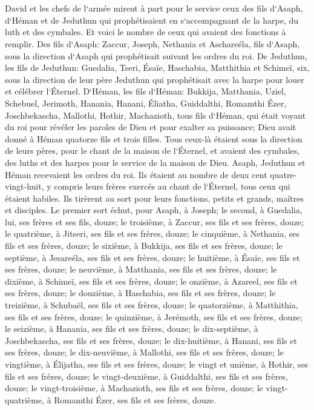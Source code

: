 \chapter{}

\verse David et les chefs de l`armée mirent à part pour le service ceux des fils d`Asaph, d`Héman et de Jeduthun qui prophétisaient en s`accompagnant de la harpe, du luth et des cymbales. Et voici le nombre de ceux qui avaient des fonctions à remplir. 
\verse Des fils d`Asaph: Zaccur, Joseph, Nethania et Aschareéla, fils d`Asaph, sous la direction d`Asaph qui prophétisait suivant les ordres du roi. 
\verse De Jeduthun, les fils de Jeduthun: Guedalia, Tseri, Ésaïe, Haschabia, Matthithia et Schimeï, six, sous la direction de leur père Jeduthun qui prophétisait avec la harpe pour louer et célébrer l`Éternel. 
\verse D`Héman, les fils d`Héman: Bukkija, Matthania, Uziel, Schebuel, Jerimoth, Hanania, Hanani, Éliatha, Guiddalthi, Romamthi Ézer, Joschbekascha, Mallothi, Hothir, Machazioth, 
\verse tous fils d`Héman, qui était voyant du roi pour révéler les paroles de Dieu et pour exalter sa puissance; Dieu avait donné à Héman quatorze fils et trois filles. 
\verse Tous ceux-là étaient sous la direction de leurs pères, pour le chant de la maison de l`Éternel, et avaient des cymbales, des luths et des harpes pour le service de la maison de Dieu. Asaph, Jeduthun et Héman recevaient les ordres du roi. 
\verse Ils étaient au nombre de deux cent quatre-vingt-huit, y compris leurs frères exercés au chant de l`Éternel, tous ceux qui étaient habiles. 
\verse Ils tirèrent au sort pour leurs fonctions, petits et grands, maîtres et disciples. 
\verse Le premier sort échut, pour Asaph, à Joseph; le second, à Guedalia, lui, ses frères et ses fils, douze; 
\verse le troisième, à Zaccur, ses fils et ses frères, douze; 
\verse le quatrième, à Jitseri, ses fils et ses frères, douze; 
\verse le cinquième, à Nethania, ses fils et ses frères, douze; 
\verse le sixième, à Bukkija, ses fils et ses frères, douze; 
\verse le septième, à Jesareéla, ses fils et ses frères, douze; 
\verse le huitième, à Ésaïe, ses fils et ses frères, douze; 
\verse le neuvième, à Matthania, ses fils et ses frères, douze; 
\verse le dixième, à Schimeï, ses fils et ses frères, douze; 
\verse le onzième, à Azareel, ses fils et ses frères, douze; 
\verse le douzième, à Haschabia, ses fils et ses frères, douze; 
\verse le treizième, à Schubaël, ses fils et ses frères, douze; 
\verse le quatorzième, à Matthithia, ses fils et ses frères, douze; 
\verse le quinzième, à Jerémoth, ses fils et ses frères, douze; 
\verse le seizième, à Hanania, ses fils et ses frères, douze; 
\verse le dix-septième, à Joschbekascha, ses fils et ses frères, douze; 
\verse le dix-huitième, à Hanani, ses fils et ses frères, douze; 
\verse le dix-neuvième, à Mallothi, ses fils et ses frères, douze; 
\verse le vingtième, à Élijatha, ses fils et ses frères, douze; 
\verse le vingt et unième, à Hothir, ses fils et ses frères, douze; 
\verse le vingt-deuxième, à Guiddalthi, ses fils et ses frères, douze; 
\verse le vingt-troisième, à Machazioth, ses fils et ses frères, douze; 
\verse le vingt-quatrième, à Romamthi Ézer, ses fils et ses frères, douze. 

